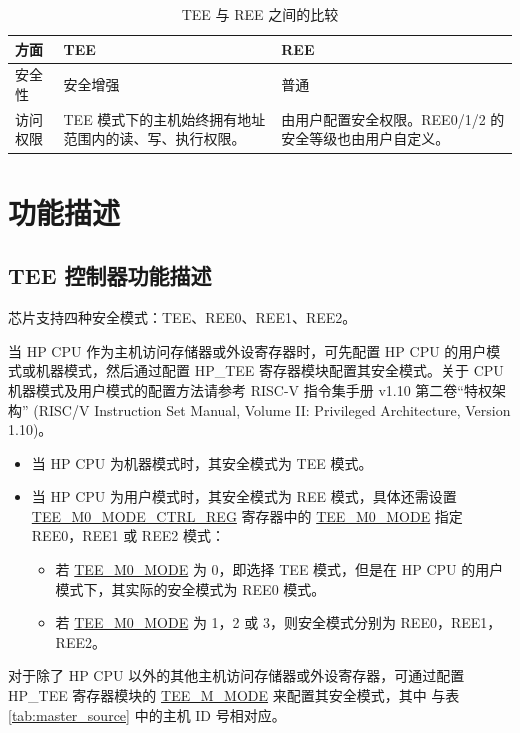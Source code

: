 \documentclass[main\_\_CN.tex]{subfiles}
\begin{document}
\begin{longtable}{|L{3cm}|L{6cm}|L{6cm}|}
    \caption{TEE 与 REE 之间的比较}
    \label{tab:tee-ree-comparison}\\
\hline{}
\textbf{方面} & \textbf{TEE} & \textbf{REE} \\
\hline
安全性 & 安全增强 & 普通 \\
\hline
访问权限 & TEE 模式下的主机始终拥有地址范围内的读、写、执行权限。 & 由用户配置安全权限。REE0/1/2 的安全等级也由用户自定义。\\
\hline
\end{longtable}

\section{功能描述}

\subsection{TEE 控制器功能描述}

\chipname{} 芯片支持四种安全模式：TEE、REE0、REE1、REE2。

当 HP CPU 作为主机访问存储器或外设寄存器时，可先配置 HP CPU 的用户模式或机器模式，然后通过配置 HP\_TEE 寄存器模块配置其安全模式。关于 CPU 机器模式及用户模式的配置方法请参考 RISC-V 指令集手册 v1.10 第二卷“特权架构” (RISC\-/V Instruction Set Manual, Volume II: Privileged Architecture, Version 1.10)。
\begin{itemize}
    \item 当 HP CPU 为机器模式时，其安全模式为 TEE 模式。
    \item 当 HP CPU 为用户模式时，其安全模式为 REE 模式，具体还需设置 \hyperref[regdesc:TEEMNMODECTRLREG]{TEE\_M0\_MODE\_CTRL\_REG} 寄存器中的 \hyperref[fielddesc:TEEMNMODE]{TEE\_M0\_MODE} 指定 REE0，REE1 或 REE2 模式：
    \begin{itemize}
        \item 若 \hyperref[fielddesc:TEEMNMODE]{TEE\_M0\_MODE} 为 0，即选择 TEE 模式，但是在 HP CPU 的用户模式下，其实际的安全模式为 REE0 模式。
        \item 若 \hyperref[fielddesc:TEEMNMODE]{TEE\_M0\_MODE} 为 1，2 或 3，则安全模式分别为 REE0，REE1，REE2。
    \end{itemize}
\end{itemize}

对于除了 HP CPU 以外的其他主机访问存储器或外设寄存器，可通过配置 HP\_TEE 寄存器模块的 \hyperref[fielddesc:TEEMNMODE]{TEE\_M\_MODE} 来配置其安全模式，其中  与表 \ref{tab:master_source} 中的主机 ID 号相对应。
\end{document}

